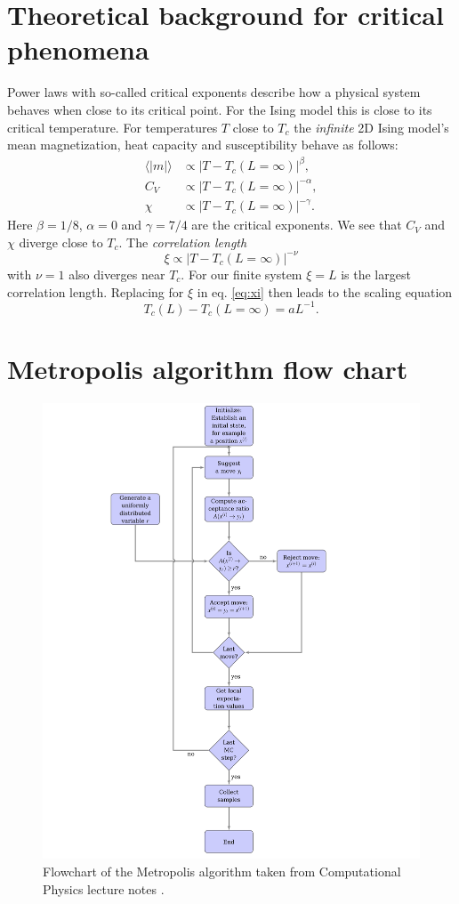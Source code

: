 \documentclass[english,notitlepage,reprint,nofootinbib]{revtex4-1}  %
\begin{document}
\section{Theoretical background for critical phenomena}\label{appendix:critical}
Power laws with so-called critical exponents describe how a physical system behaves when close to its critical point. For the Ising model this is close to its critical temperature. For temperatures $T$ close to $T_c$ the \textit{infinite} 2D Ising model's mean magnetization, heat capacity and susceptibility behave as follows: 
\begin{align*}
    \langle |m| \rangle &\propto |T-T_c(L = \infty)|^\beta, \\
    C_V &\propto |T-T_c(L = \infty)|^{-\alpha}, \\
    \chi &\propto |T-T_c(L = \infty)|^{-\gamma}. 
\end{align*}
Here $\beta = 1/8$, $\alpha = 0$ and $\gamma = 7/4$ are the critical exponents. We see that $C_V$ and $\chi$ diverge close to $T_c$. The \textit{correlation length}
\begin{equation}
    \xi \propto |T-T_c(L=\infty)|^{-\nu} \label{eq:xi}
\end{equation}
with $\nu=1$ also diverges near $T_c$. For our finite system $\xi = L$ is the largest correlation length. Replacing for $\xi$ in eq. \ref{eq:xi} then leads to the scaling equation
\begin{equation}
    T_c(L) -T_c(L=\infty) = aL^{-1}.
\end{equation}

\section{Metropolis algorithm flow chart}\label{appendix:metro}

\begin{figure}[H]
    \centering
    \includegraphics[width=1\textwidth]{../figures//metro_flow.jpg}
    \caption{Flowchart of the Metropolis algorithm taken from Computational Physics lecture notes \cite{compedium}.}
    \label{fig:metro_flow}
\end{figure}
\end{document}
